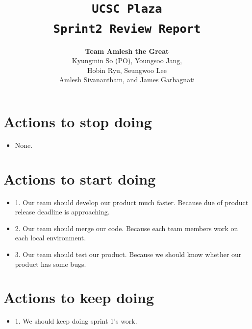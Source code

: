 \documentclass[10pt]{article}
\title{\color{primary}\texttt{UCSC Plaza \\ Sprint2 Review Report}}
\author{{\color{secondary}\textbf{Team Amlesh the Great}} \\ Kyungmin So (PO), Youngsoo Jang, \\ Hobin Ryu, Seungwoo Lee \\ Amlesh Sivanantham, and James Garbagnati }
\newcommand{\fancysecX}[2] {{\color{primary}\section*{#1} \label{sec:#2}}}
\newcommand{\fancysubX}[2] {{\color{primary}\subsection*{#1} \label{sec:#2}}}
\begin{document}
\maketitle
    
\fancysecX{Actions to stop doing}{stop}
     
        \begin{itemize}
            \item None.
        \end{itemize}    

\fancysecX{Actions to start doing}{start}
        \begin{itemize}
            \item 1. Our team should develop our product much faster. Because due of product release deadline is approaching.
            \item 2. Our team should merge our code. Because each team members work on each local environment.
            \item 3. Our team should test our product. Because we should know whether our product has some bugs.
        \end{itemize}  

\fancysecX{Actions to keep doing}{keep}
     
        \begin{itemize}
            \item 1. We should keep doing sprint 1's work.
	\end{itemize}
        
         
\end{document}

